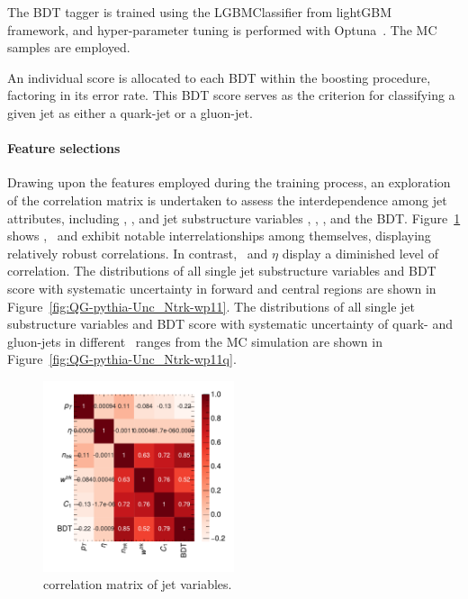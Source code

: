 The BDT tagger is trained using the LGBMClassifier from lightGBM~\cite{NIPS2017_6449f44a} framework, and hyper-parameter tuning is performed with Optuna~\cite{akiba2019optuna}. The MC \pythia samples are employed.

An individual score is allocated to each BDT within the boosting procedure, factoring in its error rate.  This BDT score serves as the criterion for classifying a given jet as either a quark-jet or a gluon-jet. 

\paragraph{Feature selections\\}
Drawing upon the features employed during the training process, an exploration of the correlation matrix is undertaken to assess the interdependence among jet attributes, including \pt, \abseta, and jet substructure variables \ntrk, \wtrk, \cbeta, and the BDT. Figure~\ref{fig:weighted_corr} shows \ntrk, \wtrk~and \cbeta exhibit notable interrelationships among themselves, displaying relatively robust correlations. In contrast, \pt~and $\eta$ display a diminished level of correlation. The distributions of all single jet substructure variables and BDT score with systematic uncertainty in forward and central regions are shown in Figure~\ref{fig:QG-pythia-Unc_Ntrk-wp11}. The distributions of all single jet substructure variables and BDT score with systematic uncertainty of quark- and gluon-jets in different \pt~ranges from the MC simulation are shown in Figure~\ref{fig:QG-pythia-Unc_Ntrk-wp11q}.

\begin{figure}[htb]
	\centering
	\includegraphics[width=0.5\textwidth]{fig/ADE/new_GBDT/corr.pdf}
	\caption{correlation matrix of jet variables.}
	\label{fig:weighted_corr}
\end{figure}

